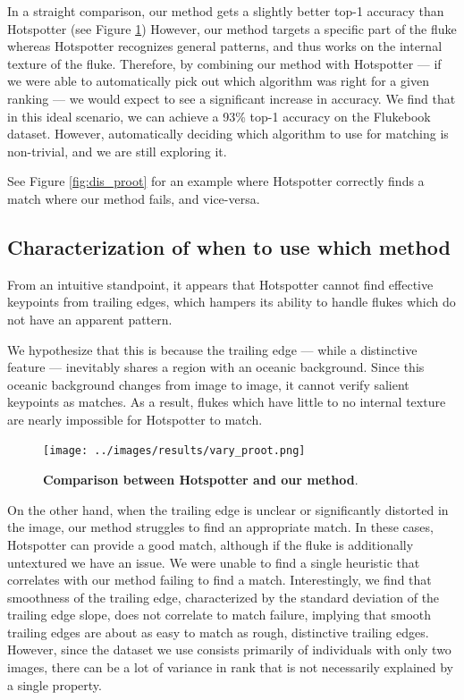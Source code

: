 In a straight comparison, our method gets a slightly better top-1 accuracy than Hotspotter (see Figure \ref{fig:vary_proot})
However, our method targets a specific part of the fluke whereas Hotspotter recognizes general patterns, and thus works on the internal texture of the fluke.
Therefore, by combining our method with Hotspotter --- if we were able to automatically pick out which algorithm was right for a given ranking --- we would expect to see a significant increase in accuracy.
We find that in this ideal scenario, we can achieve a 93\% top-1 accuracy on the Flukebook dataset.
However, automatically deciding which algorithm to use for matching is non-trivial, and we are still exploring it.

See Figure \ref{fig:dis_proot} for an example where Hotspotter correctly finds a match where our method fails, and vice-versa.

\subsection{Characterization of when to use which method}

From an intuitive standpoint, it appears that Hotspotter cannot find effective keypoints from trailing edges, which hampers its ability to handle flukes which do not have an apparent pattern.

We hypothesize that this is because the trailing edge --- while a distinctive feature --- inevitably shares a region with an oceanic background.
Since this oceanic background changes from image to image, it cannot verify salient keypoints as matches.
As a result, flukes which have little to no internal texture are nearly impossible for Hotspotter to match.

\begin{figure}[t]%
\centering
\texttt{[image: ../images/results/vary\_proot.png]}
\caption{\textbf{Comparison between Hotspotter and our method}.}
\label{fig:vary_proot}
\end{figure}



On the other hand, when the trailing edge is unclear or significantly distorted in the image, our method struggles to find an appropriate match.
In these cases, Hotspotter can provide a good match, although if the fluke is additionally untextured we have an issue.
We were unable to find a single heuristic that correlates with our method failing to find a match.
Interestingly, we find that smoothness of the trailing edge, characterized by the standard deviation of the trailing edge slope, does not correlate to match failure, implying that smooth trailing edges are about as easy to match as rough, distinctive trailing edges.
However, since the dataset we use consists primarily of individuals with only two images, there can be a lot of variance in rank that is not necessarily explained by a single property.


